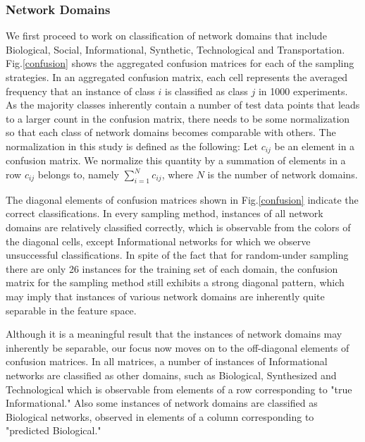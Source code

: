 \documentclass{article}
\begin{document}
 
\subsubsection{Network Domains} 
We first proceed to work on classification of network domains that include Biological, Social, Informational, Synthetic, Technological and Transportation. Fig.\ref{confusion} shows the aggregated confusion matrices for each of the sampling strategies. In an aggregated confusion matrix, each cell represents the averaged frequency that an instance of class $i$ is classified as class $j$ in 1000 experiments. As the majority classes inherently contain a number of test data points that leads to a larger count in the confusion matrix, there needs to be some normalization so that each class of network domains becomes comparable with others. The normalization in this study is defined as the following: Let $c_{ij}$ be an element in a confusion matrix. We normalize this quantity by a summation of elements in a row $c_{ij}$ belongs to, namely $\sum_{i=1}^N c_{ij}$, where $N$ is the number of network domains. 

The diagonal elements of confusion matrices shown in Fig.\ref{confusion} indicate the correct classifications. In every sampling method, instances of all network domains are relatively classified correctly, which is observable from the colors of the diagonal cells, except Informational networks for which we observe unsuccessful classifications. In spite of the fact that for random-under sampling there are only 26 instances for the training set of each domain, the confusion matrix for the sampling method still exhibits a strong diagonal pattern, which may imply that instances of various network domains are inherently quite separable in the feature space.

Although it is a meaningful result that the instances of network domains may inherently be separable, our focus now moves on to the off-diagonal elements of confusion matrices. In all matrices, a number of instances of Informational networks are classified as other domains, such as Biological, Synthesized and Technological which is observable from elements of a row corresponding to  "true Informational." Also some instances of network domains are classified as Biological networks, observed in elements of a column corresponding to "predicted Biological." 
\end{document}

